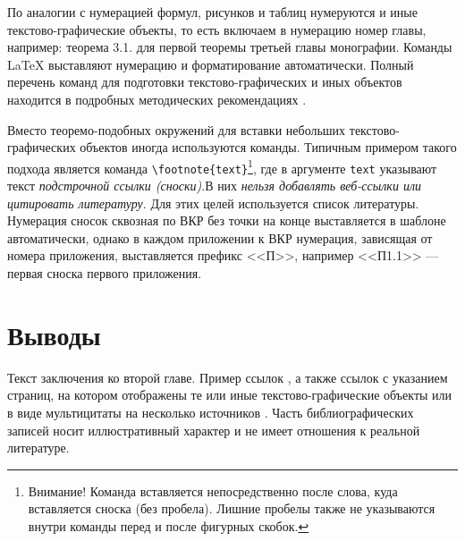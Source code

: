 





 

По аналогии с нумерацией формул, рисунков и таблиц нумеруются и иные текстово-графические объекты, то есть включаем в нумерацию номер главы, например: теорема 3.1. для первой теоремы третьей главы монографии. Команды \LaTeX{} выставляют нумерацию и форматирование автоматически. Полный перечень команд для подготовки текстово-графических и иных объектов находится в подробных методических рекомендациях \cite{spbpu-bci-template-author-guide}. 








Вместо теоремо-подобных окружений для вставки небольших текстово-графических объектов иногда используются команды. Типичным примером такого подхода является команда \verb|\footnote{text}|\footnote{Внимание! Команда вставляется непосредственно после слова, куда вставляется сноска (без пробела). Лишние пробелы также не указываются внутри команды перед и после фигурных скобок.}, где в аргументе \verb|text| указывают текст \textit{подстрочной ссылки (сноски)}.В них \textit{нельзя добавлять веб-ссылки или цитировать литературу}. Для этих целей используется список литературы. Нумерация сносок сквозная по ВКР без точки на конце выставляется в шаблоне автоматически, однако в каждом приложении к ВКР нумерация, зависящая от номера приложения, выставляется префикс <<П>>, например <<П1.1>> --- первая сноска первого приложения. 






\section{Выводы} \label{ch2:conclusion}

Текст заключения ко второй главе. Пример ссылок \cite{Article,Book,Booklet,Conference,Inbook,Incollection,Manual,Mastersthesis,Misc,Phdthesis,Proceedings,Techreport,Unpublished,badiou:briefings}, а также ссылок с указанием страниц, на котором отображены те или иные текстово-графические объекты  \cite[с.~96]{Naidenova2017} или в виде мультицитаты на несколько источников \cites[с.~96]{Naidenova2017}[с.~46]{Ganter1999}. Часть библиографических записей носит иллюстративный характер и не имеет отношения к реальной литературе. 

